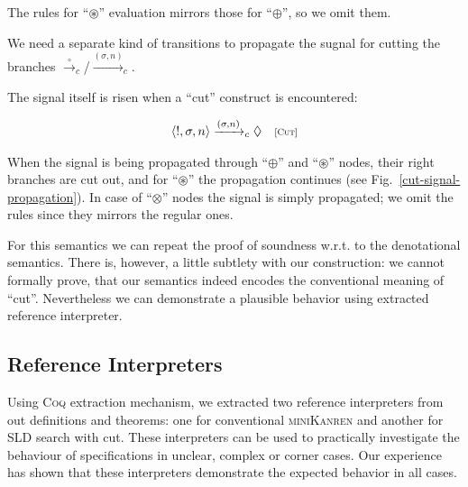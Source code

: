 The rules for ``$\circledast$'' evaluation mirrors those for ``$\oplus$'', so we omit them.

We need a separate kind of transitions to propagate the sugnal for cutting the branches $\xrightarrow{\circ}_c$/$\xrightarrow{(\sigma, n)}_c$.

The signal itself is risen when a ``cut'' construct is encountered:

\[
\begin{array}{cr}
  \left<{!, \sigma, n}\right> \xrightarrow{(\sigma, n)}_c \Diamond &\mbox{\scriptsize{[\textsc{Cut}]}} 
\end{array}
\]

When the signal is being propagated through ``$\oplus$'' and ``$\circledast$'' nodes, their right branches are cut out, and for ``$\circledast$'' the
propagation continues (see Fig.~\ref{cut-signal-propagation}). In case of ``$\otimes$'' nodes the signal is simply propagated; we omit the rules since they mirrors the regular ones.

For this semantics we can repeat the proof of soundness w.r.t. to the denotational semantics. There is, however, a little subtlety with our construction:
we cannot formally prove, that our semantics indeed encodes the conventional meaning of ``cut''. Nevertheless we can demonstrate a plausible behavior
using extracted reference interpreter.


\subsection{Reference Interpreters}

Using \textsc{Coq} extraction mechanism, we extracted two reference interpreters from out definitions and theorems: one for conventional
\textsc{miniKanren} and another for SLD search with cut. These interpreters can be used to practically investigate the behaviour
of specifications in unclear, complex or corner cases. Our experience has shown that these interpreters demonstrate the expected behavior
in all cases.

